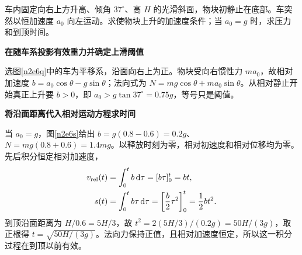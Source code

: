 \begin{question}\begin{example}[车内沿光滑斜面上升]\label{n2e6}
车内固定向右上方升高、倾角 $37^\circ$、高 $H$ 的光滑斜面，物块初静止在底部。车突然以恒加速度 $a_0$ 向左运动。求使物块上升的加速度条件；当 $a_0=g$ 时，求压力和到顶时间。
\end{example}\end{question}
\begin{solution}\textbf{在随车系投影有效重力并确定上滑阈值}\par\nobreak
选图\ref{n2e6q}中的车为平移系，沿面向右上为正。物块受向右惯性力 $ma_0$，故相对加速度 $b=a_0\cos\theta-g\sin\theta$；法向式为 $N=mg\cos\theta+ma_0\sin\theta$。从相对静止开始真正上升要 $b>0$，即 $a_0>g\tan37^\circ=0.75g$，等号只是阈值。


\par\medskip{}\noindent\textbf{将沿面距离代入相对运动方程求时间}\par\nobreak
当 $a_0=g$，图\ref{n2e6s}给出 $b=g(0.8-0.6)=0.2g$、$N=mg(0.8+0.6)=1.4mg$。以释放时刻为零，相对初速度和相对位移均为零。先后积分恒定相对加速度，
\begin{align*}
 v_{\rm rel}(t)&=\int_0^t b\mathop{}\!\mathrm d\tau=[b\tau]_0^t=bt,\\
 s(t)&=\int_0^t b\tau\mathop{}\!\mathrm d\tau
 =\left[\frac b2\tau^2\right]_0^t=\frac12bt^2.
\end{align*}
到顶沿面距离为 $H/0.6=5H/3$，故 $t^2=2(5H/3)/(0.2g)=50H/(3g)$，取正根得 $t=\sqrt{50H/(3g)}$。法向力保持正值，且相对加速度恒定，所以这一积分过程在到顶以前有效。
\end{solution}

